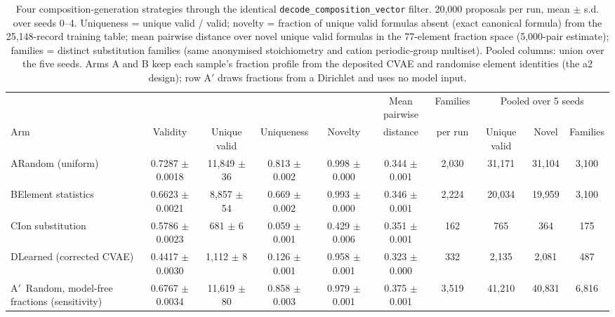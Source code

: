 \begin{table}[t]
\centering
\small
\caption{Four composition-generation strategies through the identical \texttt{decode\_composition\_vector} filter. 20{,}000 proposals per run, mean $\pm$ s.d. over seeds 0--4. Uniqueness = unique valid / valid; novelty = fraction of unique valid formulas absent (exact canonical formula) from the 25{,}148-record training table; mean pairwise distance over novel unique valid formulas in the 77-element fraction space (5{,}000-pair estimate); families = distinct substitution families (same anonymised stoichiometry and cation periodic-group multiset). Pooled columns: union over the five seeds. Arms A and B keep each sample's fraction profile from the deposited CVAE and randomise element identities (the a2 design); row A$'$ draws fractions from a Dirichlet and uses no model input.}
\label{tab:a9_counts}
\begin{tabular}{lccccccccc}
\toprule
 & & & & & Mean pairwise & Families & \multicolumn{3}{c}{Pooled over 5 seeds} \\
\cmidrule(lr){8-10}
Arm & Validity & Unique valid & Uniqueness & Novelty & distance & per run & Unique valid & Novel & Families \\
\midrule
A\quad Random (uniform) & 0.7287 $\pm$ 0.0018 & 11{,}849 $\pm$ 36 & 0.813 $\pm$ 0.002 & 0.998 $\pm$ 0.000 & 0.344 $\pm$ 0.001 & 2{,}030 & 31{,}171 & 31{,}104 & 3{,}100 \\
B\quad Element statistics & 0.6623 $\pm$ 0.0021 & 8{,}857 $\pm$ 54 & 0.669 $\pm$ 0.002 & 0.993 $\pm$ 0.000 & 0.346 $\pm$ 0.001 & 2{,}224 & 20{,}034 & 19{,}959 & 3{,}100 \\
C\quad Ion substitution & 0.5786 $\pm$ 0.0023 & 681 $\pm$ 6 & 0.059 $\pm$ 0.001 & 0.429 $\pm$ 0.006 & 0.351 $\pm$ 0.001 & 162 & 765 & 364 & 175 \\
D\quad Learned (corrected CVAE) & 0.4417 $\pm$ 0.0030 & 1{,}112 $\pm$ 8 & 0.126 $\pm$ 0.001 & 0.958 $\pm$ 0.001 & 0.323 $\pm$ 0.000 & 332 & 2{,}135 & 2{,}081 & 487 \\
\midrule
A$'$\ Random, model-free fractions (sensitivity) & 0.6767 $\pm$ 0.0034 & 11{,}619 $\pm$ 80 & 0.858 $\pm$ 0.003 & 0.979 $\pm$ 0.001 & 0.375 $\pm$ 0.001 & 3{,}519 & 41{,}210 & 40{,}831 & 6{,}816 \\
\bottomrule
\end{tabular}
\end{table}
